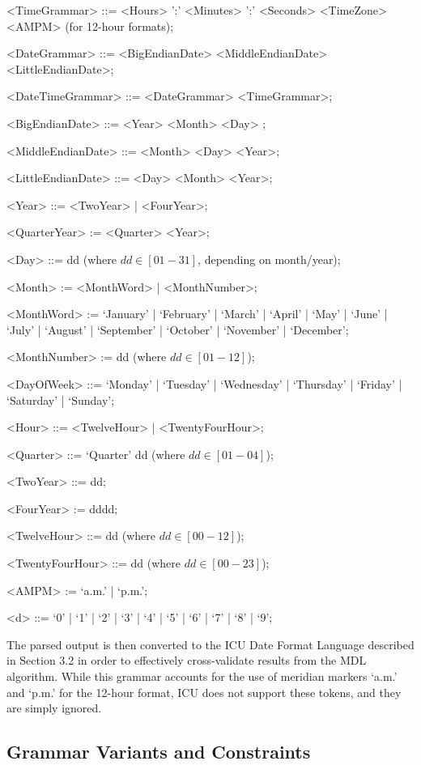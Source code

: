 \begin{grammar}
<TimeGrammar> ::= <Hours> ':' <Minutes> ':' <Seconds> <TimeZone> <AMPM> (for 12-hour formats);

<DateGrammar> ::= <BigEndianDate> 
				\alt <MiddleEndianDate> 
				\alt <LittleEndianDate>;

<DateTimeGrammar>  ::= <DateGrammar> 
					\alt <TimeGrammar>;
					

<BigEndianDate> ::= <Year> <Month>  <Day> ;

<MiddleEndianDate> ::= <Month> <Day> <Year>;

<LittleEndianDate> ::= <Day> <Month> <Year>;

<Year> ::= <TwoYear> | <FourYear>;

<QuarterYear> := <Quarter> <Year>;

<Day>     ::= dd (where $dd \in [01-31]$, depending on month/year);

<Month> := <MonthWord> | <MonthNumber>;

<MonthWord> := `January' | `February' | `March' | `April' | `May' | `June' | `July' | `August' | `September' | `October' | `November' | `December';

<MonthNumber> := dd (where $dd \in [01-12]$);

<DayOfWeek> ::= `Monday' | `Tuesday' | `Wednesday' | `Thursday' | `Friday' | `Saturday' | `Sunday';

<Hour> ::= <TwelveHour> | <TwentyFourHour>;

<Quarter> ::= `Quarter' dd (where $dd \in [01 - 04]$);

<TwoYear> ::= dd;

<FourYear> := dddd;

<TwelveHour> ::= dd (where $dd \in [00-12]$);

<TwentyFourHour> ::= dd (where $dd \in [00 -23]$);

<AMPM> := `a.m.' | `p.m.';

<d> ::= `0' | `1' | `2' | `3' | `4' | `5' | `6' | `7' | `8' | `9';

\end{grammar}


The parsed output is then converted to the ICU Date Format Language described in Section 3.2 in order to effectively cross-validate results from the MDL algorithm. While this grammar accounts for the use of meridian markers `a.m.' and `p.m.' for the 12-hour format, ICU does not support these tokens, and they are simply ignored.

\subsection{Grammar Variants and Constraints}

